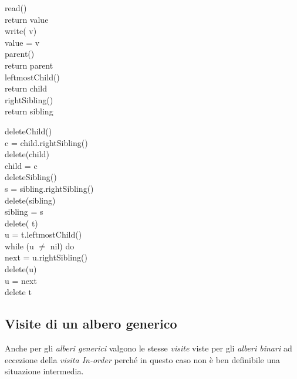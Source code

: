 \begin{codecont}
    \begin{minipage}[t]{0.48\textwidth}
        \ind{} read()\\
            return value\\

        \ind write( v)\\
            value = v\\

        \ind{} parent()\\
            return parent\\
            
        \ind{} leftmostChild()\\
            return child\\

        \ind{} rightSibling()\\
            return sibling\\
    \end{minipage}
    \hfill
    \begin{minipage}[t]{0.48\textwidth}
        \ind deleteChild()\\
             c = child.rightSibling()\\
            delete(child)\\
            child = c\\

        \ind deleteSibling()\\
             s = sibling.rightSibling()\\
            delete(sibling)\\
            sibling = s\\

        \ind delete( t)\\
             u = t.leftmostChild()\\
            \indf while (u $\neq$ nil) do\\
                 next = u.rightSibling()\\
                delete(u)\\
                u = next\\
            \indf delete t\\
    \end{minipage}
\end{codecont}

\subsection{Visite di un albero generico}
Anche per gli \emph{alberi generici} valgono le stesse \emph{visite} viste
per gli \emph{alberi binari} ad eccezione della \emph{visita In-order} perché
in questo caso non è ben definibile una situazione intermedia.

